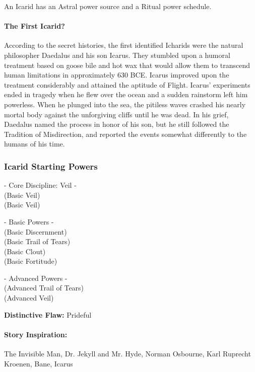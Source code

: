 An Icarid has an Astral power source and a Ritual power schedule.

\paragraph{The First Icarid?} According to the secret histories, the first identified Icharids were the natural philosopher Daedalus and his son Icarus. They stumbled upon a humoral treatment based on goose bile and hot wax that would allow them to transcend human limitations in approximately 630 BCE. Icarus improved upon the treatment considerably and attained the aptitude of Flight. Icarus' experiments ended in tragedy when he flew over the ocean and a sudden rainstorm left him powerless. When he plunged into the sea, the pitiless waves crashed his nearly mortal body against the unforgiving cliffs until he was dead. In his grief, Daedalus named the process in honor of his son, but he still followed the Tradition of Misdirection, and reported the events somewhat differently to the humans of his time.

\subsubsection{Icarid Starting Powers}

\hspace{\parindent} - Core Discipline: Veil -\\
 (Basic Veil)\\
 (Basic Veil)

- Basic Powers -\\
 (Basic Discernment)\\
 (Basic Trail of Tears)\\
 (Basic Clout)\\
 (Basic Fortitude)

- Advanced Powers -\\
 (Advanced Trail of Tears)\\
 (Advanced Veil)

\textbf{Distinctive Flaw:} Prideful

\paragraph{Story Inspiration:} The Invisible Man, Dr. Jekyll and Mr. Hyde, Norman Osbourne, Karl Ruprecht Kroenen, Bane, Icarus

